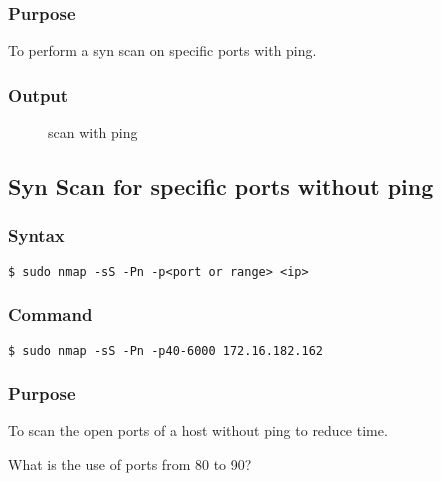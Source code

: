 \documentclass[11pt]{article}
\begin{document}
\subsubsection*{Purpose}
To perform a syn scan on specific ports with ping.

\subsubsection*{Output}
\begin{figure}[H]
    \centering
    \caption{scan with ping}
    \label{fig:1}
\end{figure}


\subsection{Syn Scan for specific ports without ping}
\subsubsection{Syntax}
\begin{verbatim}
$ sudo nmap -sS -Pn -p<port or range> <ip>
\end{verbatim}

\subsubsection*{Command}
\begin{verbatim}
$ sudo nmap -sS -Pn -p40-6000 172.16.182.162
\end{verbatim}

\subsubsection*{Purpose}
To scan the open ports of a host without ping to reduce time.

What is the use of ports from 80 to 90?
\end{document}
